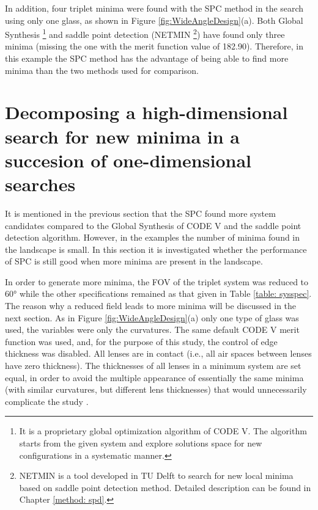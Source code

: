 In addition, four triplet minima were found with the SPC method in the search using only one glass, as shown in Figure \ref{fig:WideAngleDesign}(a). Both Global Synthesis \footnote{It is a proprietary global optimization algorithm of CODE V. The algorithm starts from the given system and explore solutions space for new configurations in a systematic manner.} and saddle point detection
(NETMIN \footnote{NETMIN is a tool developed in TU Delft to search for new local minima based on saddle point detection method. Detailed description can be found in Chapter \ref{method: spd}.}) have found only three minima (missing the one with the merit function value of 182.90). Therefore, in this example the SPC method has the advantage of being able to find more minima than the two methods used for comparison. 

\section{Decomposing a high-dimensional search for new minima in a succesion of one-dimensional searches}  \label{chrom60d}

It is mentioned in the previous section that the SPC found more system candidates compared to the Global Synthesis of CODE V and the saddle point detection algorithm. However, in the examples the number of minima found in the landscape is small. In this section it is investigated whether the performance of SPC is still good when more minima are present in the landscape.

In order to generate more minima, the FOV of the triplet system was reduced to 60° while the other specifications remained as that given in Table \ref{table: sysspec}. The reason why a reduced
field leads to more minima will be discussed in the next section.
As in Figure \ref{fig:WideAngleDesign}(a) only one type of glass was used, the variables were only the curvatures. The same default CODE V merit function was used, and, for the purpose of this study, the control of edge thickness was disabled. All lenses are in contact (i.e., all air spaces between lenses have zero thickness). The thicknesses of all lenses in a minimum system are set equal, in order to avoid the multiple appearance of essentially the same minima (with similar curvatures, but different lens thicknesses) that would unnecessarily complicate the study \cite{HouProc2015}.

